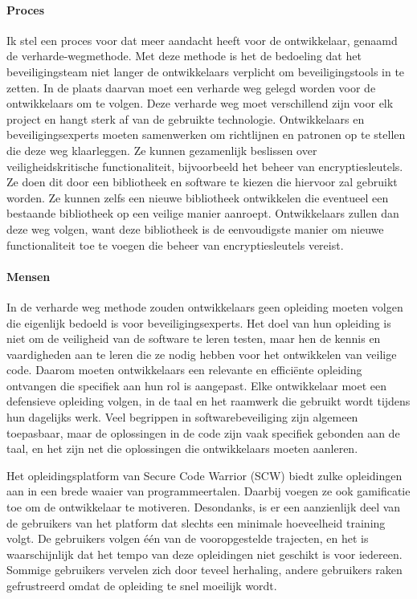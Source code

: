 \paragraph{Proces}
Ik stel een proces voor dat meer aandacht heeft voor de ontwikkelaar, genaamd de verharde-wegmethode.
Met deze methode is het de bedoeling dat het beveiligingsteam niet langer de ontwikkelaars verplicht om beveiligingstools in te zetten.
In de plaats daarvan moet een verharde weg gelegd worden voor de ontwikkelaars om te volgen.
Deze verharde weg moet verschillend zijn voor elk project en hangt sterk af van de gebruikte technologie.
Ontwikkelaars en beveiligingsexperts moeten samenwerken om richtlijnen en patronen op te stellen die deze weg klaarleggen.
Ze kunnen gezamenlijk beslissen over veiligheidskritische functionaliteit, bijvoorbeeld het beheer van encryptiesleutels.
Ze doen dit door een bibliotheek en software te kiezen die hiervoor zal gebruikt worden.
Ze kunnen zelfs een nieuwe bibliotheek ontwikkelen die eventueel een bestaande bibliotheek op een veilige manier aanroept.
Ontwikkelaars zullen dan deze weg volgen, want deze bibliotheek is de eenvoudigste manier om nieuwe functionaliteit toe te voegen die beheer van encryptiesleutels vereist.

\paragraph{Mensen}
In de verharde weg methode zouden ontwikkelaars geen opleiding moeten volgen die eigenlijk bedoeld is voor beveiligingsexperts.
Het doel van hun opleiding is niet om de veiligheid van de software te leren testen, maar hen de kennis en vaardigheden aan te leren die ze nodig hebben voor het ontwikkelen van veilige code.
Daarom moeten ontwikkelaars een relevante en efficiënte opleiding ontvangen die specifiek aan hun rol is aangepast.
Elke ontwikkelaar moet een defensieve opleiding volgen, in de taal en het raamwerk die gebruikt wordt tijdens hun dagelijks werk.
Veel begrippen in softwarebeveiliging zijn algemeen toepasbaar, maar de oplossingen in de code zijn vaak specifiek gebonden aan de taal, en het zijn net die oplossingen die ontwikkelaars moeten aanleren.

Het opleidingsplatform van Secure Code Warrior (SCW) biedt zulke opleidingen aan in een brede waaier van programmeertalen.
Daarbij voegen ze ook gamificatie toe om de ontwikkelaar te motiveren.
Desondanks, is er een aanzienlijk deel van de gebruikers van het platform dat slechts een minimale hoeveelheid training volgt.
De gebruikers volgen één van de vooropgestelde trajecten, en het is waarschijnlijk dat het tempo van deze opleidingen niet geschikt is voor iedereen.
Sommige gebruikers vervelen zich door teveel herhaling, andere gebruikers raken gefrustreerd omdat de opleiding te snel moeilijk wordt.

